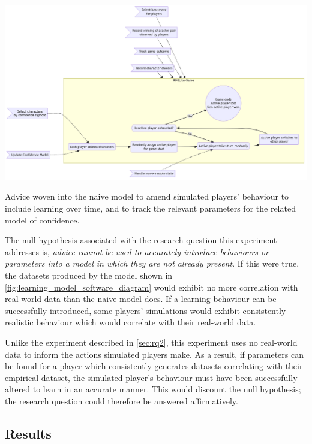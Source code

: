 \begin{table}[h]
  \centering
  \includegraphics[width=\columnwidth]{70_generality_of_aspects/diagrams/exp3_learning_model.png}
  \caption{Advice woven into the naive model to amend simulated players' behaviour to include learning over time, and to track the relevant parameters for the related model of confidence.}
  \label{fig:learning_model_software_diagram}
\end{table}

The null hypothesis associated with the research question this experiment
addresses is, \emph{advice cannot be used to accurately introduce behaviours or
parameters into a model in which they are not already present}. If this were
true, the datasets produced by the \aspectoriented model shown in
\cref{fig:learning_model_software_diagram} would exhibit no more correlation with
real-world data than the naive model does. If a learning behaviour can be
successfully introduced, some players' simulations would exhibit consistently
realistic behaviour which would correlate with their real-world data.

Unlike the experiment described in \cref{sec:rq2}, this experiment uses no
real-world data to inform the actions simulated players make. As a result, if
parameters can be found for a player which consistently generates datasets
correlating with their empirical dataset, the simulated player's behaviour must
have been successfully altered to learn in an accurate manner. This would
discount the null hypothesis; the research question could therefore be answered
affirmatively.




\subsection{Results}


